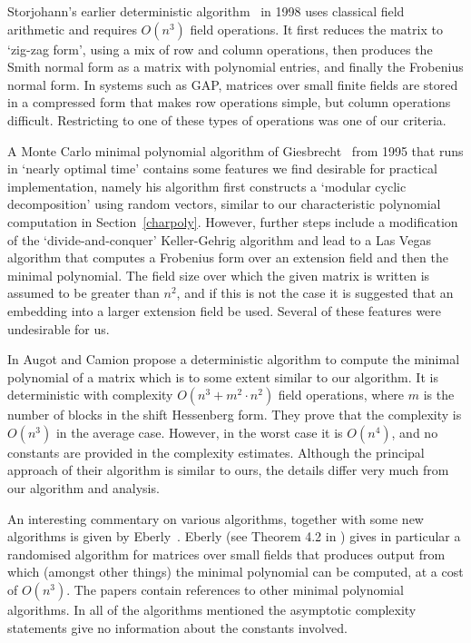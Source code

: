 Storjohann's earlier deterministic algorithm~\cite{Stor98} in 1998 uses classical 
field arithmetic and requires $O(n^3)$ field operations. 
It first reduces the matrix to `zig-zag form', using a mix of row 
and column operations, then produces the Smith normal form 
as a matrix with polynomial entries, and finally the Frobenius normal form.
In systems such as {\sf GAP}, matrices over small finite fields 
are stored in a compressed form that
makes row operations simple, but column operations difficult.
Restricting to one of these types of operations was one of our criteria.

A Monte Carlo minimal polynomial algorithm of Giesbrecht~\cite{Gie95} from 1995
that runs in `nearly optimal time' contains some 
features we find desirable for practical implementation, namely 
his algorithm first constructs a `modular cyclic decomposition' 
using random vectors, similar to our characteristic polynomial 
computation in Section~\ref{charpoly}. However, further steps include a 
modification of the `divide-and-conquer' 
Keller-Gehrig algorithm \cite{KelG85} and lead to a 
Las Vegas algorithm that computes a Frobenius form over an extension 
field and then the minimal polynomial.
The field size over which the given matrix is written is assumed 
to be greater than $n^2$, and if this is not the case it is 
suggested that an embedding into a larger extension field be used.
Several of these features were undesirable for us.

In \cite[Section 4]{AC97} Augot and Camion propose a deterministic algorithm
to compute the minimal polynomial of a matrix which is to some extent
similar to our algorithm. It is deterministic with
complexity $O(n^3 + m^2 \cdot n^2)$ field operations, 
where $m$ is the number of blocks
in the shift Hessenberg form. They prove that the complexity is $O(n^3)$ in the
average case. However, in the worst case it is $O(n^4)$, and 
no constants are provided in the complexity estimates. Although the
principal approach of their algorithm is similar to ours, the details
differ very much from our algorithm and analysis.

An interesting commentary on various algorithms, together with some new 
algorithms is given by Eberly~\cite{Eb00}. Eberly (see Theorem 4.2
in \cite{Eb00}) gives in particular a randomised algorithm for matrices 
over small fields that produces output from which (amongst other things)
the minimal polynomial can be computed, at a cost of $O(n^3)$.
The papers \cite{Eb00,Gie95,Steel,Stor98,Stor01} contain references to other 
minimal polynomial algorithms.  In all of the algorithms mentioned 
the asymptotic complexity statements give no information about 
the constants involved. 

